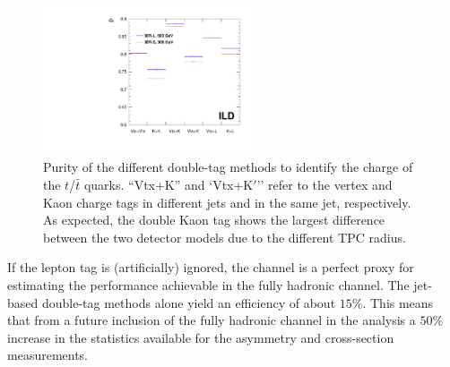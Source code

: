 \begin{figure}[htbp]
\begin{center} \includegraphics[width=0.55\textwidth]{Performance/fig/p_value_l5_ele_mu_noLcut.pdf}
\end{center}
\caption{Purity of the different double-tag methods to identify the charge of the $t$/$\bar{t}$ quarks. ``Vtx+K'' and `Vtx+K$'$'' refer to the vertex and Kaon charge tags in different jets and in the same jet, respectively. As expected, the double Kaon tag shows the largest difference between the two detector models due to the different TPC radius.}
\label{fig:ttbar:effi}
\end{figure}

If the lepton tag is (artificially) ignored, the channel is a perfect proxy for estimating the performance achievable in the fully hadronic channel. The jet-based double-tag methods alone yield an efficiency of about $15\%$. This means that from a future inclusion of the fully hadronic channel in the analysis a $50\%$ increase in the statistics available for the asymmetry and cross-section measurements.



